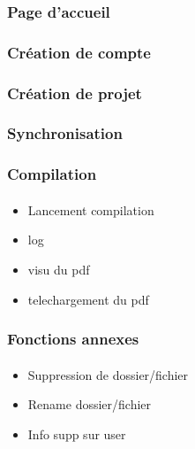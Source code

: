\documentclass[a4paper,12pt]{article}
\begin{document}
\subsubsection{Page d'accueil}

\subsubsection{Création de compte}
\paragraph*{}

\subsubsection{Création de projet}
\paragraph*{}

\subsubsection{Synchronisation}
\paragraph*{}

\subsubsection{Compilation}
\paragraph*{}
\begin{itemize}
 \item Lancement compilation
 \item log
 \item visu du pdf
 \item telechargement du pdf
\end{itemize}


\subsubsection{Fonctions annexes}
\paragraph*{}
\begin{itemize}
 \item Suppression de dossier/fichier
 \item Rename dossier/fichier
 \item Info supp sur user
\end{itemize}
\end{document}
